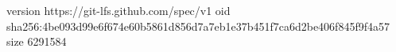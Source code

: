 version https://git-lfs.github.com/spec/v1
oid sha256:4be093d99e6f674e60b5861d856d7a7eb1e37b451f7ca6d2be406f845f9f4a57
size 6291584
